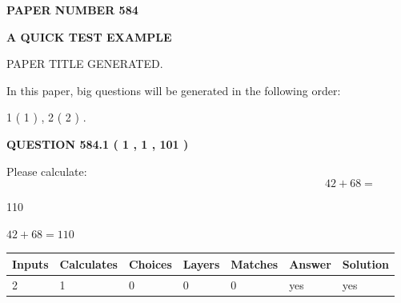 \documentclass[12pt]{article}
\begin{document}
   
   
   
 {\textbf{ \Large{ PAPER NUMBER  584  }}}
   
   
\vspace{0.2in}
   
   
   
   
   
   
   
   
 \vspace{0.2in}
{\LARGE {\textbf{ A QUICK TEST EXAMPLE}}}
   
   
 PAPER TITLE GENERATED.
   
   
   
\vspace{0.2in}
   
In this paper, big questions will be generated in the following order: 
   
   
   1 ( 1 )
 ,
   2 ( 2 )
 .
  
\vspace{0.2in}
  
{\textbf{\Large{QUESTION
584.1 
 ( 1 , 1 , 101 )
}}}
  
  
 
Please calculate:
\begin{equation}
42 +  %
68 = \nonumber
\end{equation}
 
 
 
\noindent{}
 
 

110
 
 
\noindent{}
 
 

 
 
 
\noindent{}
 
 

$ %
42 +  %
68=   %
110$
 
 
\noindent{}
 
 

 
   
   
   
   
\noindent\begin{tabular}{|l|l|l|l|l|l|l|}
 \hline
Inputs & Calculates & Choices & Layers & Matches & Answer & Solution \\ \hline
 2  & 
 1  & 
 0
  & 
 0  & 
 0  & 
  yes & 
  yes 
  \\ \hline
 \end{tabular}
   
\end{document}
